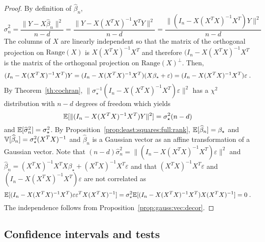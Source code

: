 \begin{proof}
By definition of $\widehat \beta_n$,
\[
\widehat \sigma^2_n =\frac{\|Y - X\widehat \beta_n \|^2}{n-d} = \frac{\|Y - X(X^TX)^{-1}X^TY\|^2}{n-d} = \frac{\|(I_n - X(X^TX)^{-1}X^T)Y\|^2}{n-d}
\]
The columns of $X$ are linearly independent so that the matrix of the orthogonal projection on $\mathrm{Range}(X)$ is $X(X^TX)^{-1}X^T$ and therefore $(I_n - X(X^TX)^{-1}X^T$ is the matrix  of the orthogonal projection on $\mathrm{Range}(X)^{\perp}$. Then,
\[
(I_n - X(X^TX)^{-1}X^T)Y = (I_n - X(X^TX)^{-1}X^T)(X\beta_\star + \varepsilon) = (I_n - X(X^TX)^{-1}X^T)\varepsilon\;.
\]
By Theorem~\ref{th:cochran}, $\|\sigma_\star^{-1}(I_n - X(X^TX)^{-1}X^T)\varepsilon\|^2$ has a $\chi^2$ distribution with $n-d$ degrees of freedom which yields
\[
\mathbb{E}[\|(I_n - X(X^TX)^{-1}X^T)Y\|^2] = \sigma_\star^2(n-d)
\]
and $\mathbb{E}[\widehat \sigma^2_n ] = \sigma_\star^2$. By Proposition~\ref{prop:least:squares:full:rank}, $\mathbb{E}[\widehat \beta_n] = \beta_\star$ and $\mathbb{V}[\widehat \beta_n] = \sigma_\star^2(X^TX)^{-1}$ and $\widehat \beta_n$ is a Gaussian vector as an  affine transformation of a Gaussian vector. Note that $(n-d)\widehat \sigma^2_n = \|(I_n - X(X^TX)^{-1}X^T)\varepsilon\|^2$ and $\widehat \beta_n = (X^TX)^{-1}X^TX\beta_{\star} + (X^TX)^{-1}X^T\varepsilon$ and that $(X^TX)^{-1}X^T\varepsilon$ and $(I_n - X(X^TX)^{-1}X^T)\varepsilon$ are not correlated as 
\[
\mathbb{E}[(I_n - X(X^TX)^{-1}X^T)\varepsilon \varepsilon^TX(X^TX)^{-1}] = \sigma_\star^2\mathbb{E}[(I_n - X(X^TX)^{-1}X^T)X(X^TX)^{-1}] = 0\;.
\]
The independence follows from Proposition~\ref{prop:gauss:vec:decor}.
\end{proof}

\subsection{Confidence intervals and tests}
